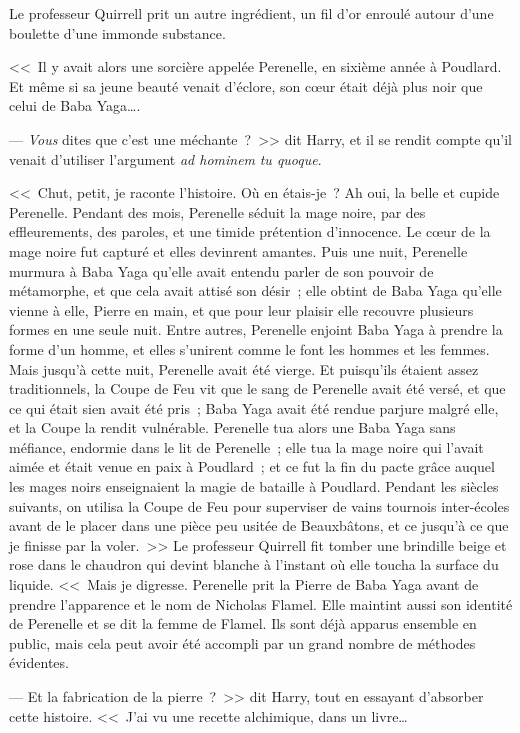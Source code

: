 Le professeur Quirrell prit un autre ingrédient, un fil d'or enroulé autour d'une boulette d'une immonde substance.

<<~Il y avait alors une sorcière appelée Perenelle, en sixième année à Poudlard. Et même si sa jeune beauté venait d'éclore, son cœur était déjà plus noir que celui de Baba Yaga….

--- \emph{Vous} dites que c'est une méchante~?~>> dit Harry, et il se rendit compte qu'il venait d'utiliser l'argument \emph{ad hominem} \emph{tu quoque}.

<<~Chut, petit, je raconte l'histoire. Où en étais-je~? Ah oui, la belle et cupide Perenelle. Pendant des mois, Perenelle séduit la mage noire, par des effleurements, des paroles, et une timide prétention d'innocence. Le cœur de la mage noire fut capturé et elles devinrent amantes. Puis une nuit, Perenelle murmura à Baba Yaga qu'elle avait entendu parler de son pouvoir de métamorphe, et que cela avait attisé son désir~; elle obtint de Baba Yaga qu'elle vienne à elle, Pierre en main, et que pour leur plaisir elle recouvre plusieurs formes en une seule nuit. Entre autres, Perenelle enjoint Baba Yaga à prendre la forme d'un homme, et elles s'unirent comme le font les hommes et les femmes. Mais jusqu'à cette nuit, Perenelle avait été vierge. Et puisqu'ils étaient assez traditionnels, la Coupe de Feu vit que le sang de Perenelle avait été versé, et que ce qui était sien avait été pris~; Baba Yaga avait été rendue parjure malgré elle, et la Coupe la rendit vulnérable. Perenelle tua alors une Baba Yaga sans méfiance, endormie dans le lit de Perenelle~; elle tua la mage noire qui l'avait aimée et était venue en paix à Poudlard~; et ce fut la fin du pacte grâce auquel les mages noirs enseignaient la magie de bataille à Poudlard. Pendant les siècles suivants, on utilisa la Coupe de Feu pour superviser de vains tournois inter-écoles avant de le placer dans une pièce peu usitée de Beauxbâtons, et ce jusqu'à ce que je finisse par la voler.~>> Le professeur Quirrell fit tomber une brindille beige et rose dans le chaudron qui devint blanche à l'instant où elle toucha la surface du liquide. <<~Mais je digresse. Perenelle prit la Pierre de Baba Yaga avant de prendre l'apparence et le nom de Nicholas Flamel. Elle maintint aussi son identité de Perenelle et se dit la femme de Flamel. Ils sont déjà apparus ensemble en public, mais cela peut avoir été accompli par un grand nombre de méthodes évidentes.

--- Et la fabrication de la pierre~?~>> dit Harry, tout en essayant d'absorber cette histoire. <<~J'ai vu une recette alchimique, dans un livre…


